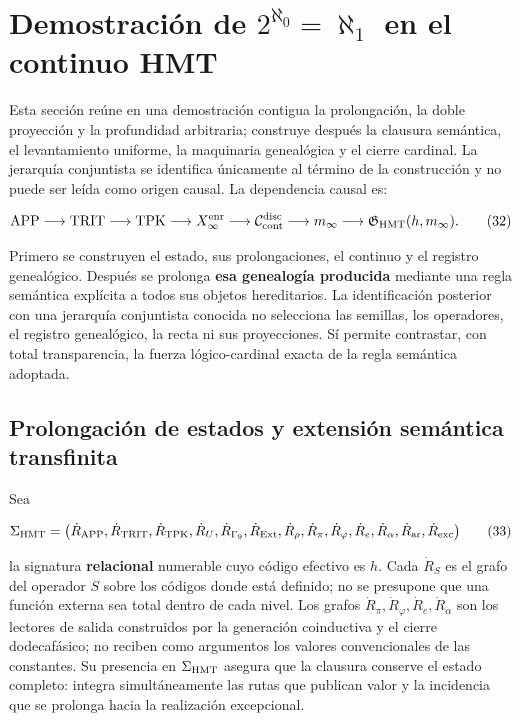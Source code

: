 \section{Demostración de \texorpdfstring{\(2^{\aleph_0}=\aleph_1\)}{2 elevado a aleph cero igual a aleph uno} en el continuo HMT}
\label{ix:sec:cierre-cardinal-nativo}

Esta sección reúne en una demostración contigua la prolongación, la doble
proyección y la profundidad arbitraria; construye después la clausura
semántica, el levantamiento uniforme, la maquinaria genealógica y el cierre
cardinal. La jerarquía conjuntista se identifica únicamente al término de la
construcción y no puede ser leída como origen causal. La dependencia causal es:

\[
 \mathrm{APP}\longrightarrow\mathrm{TRIT}\longrightarrow\mathrm{TPK}
 \longrightarrow X_\infty^{\rm enr}
 \longrightarrow\mathcal C_{\rm cont}^{\rm disc}
 \longrightarrow m_\infty
 \longrightarrow\mathfrak G_{\rm HMT}(h,m_\infty).
\tag{32}\label{ix:eq:ch-cadena-causal}
\]

Primero se construyen el estado, sus prolongaciones, el continuo y el registro genealógico.
Después se prolonga \textbf{esa genealogía producida} mediante una regla semántica
explícita a todos sus objetos hereditarios. La identificación posterior con
una jerarquía conjuntista conocida no selecciona las semillas, los operadores,
el registro genealógico, la recta ni sus proyecciones. Sí permite contrastar, con total
transparencia, la fuerza lógico-cardinal exacta de la regla semántica adoptada.

\subsection{Prolongación de estados y extensión semántica transfinita}

Sea

\[
 \Sigma_{\rm HMT}
 =\bigl(\dot R_{\rm APP},\dot R_{\rm TRIT},\dot R_{\rm TPK},
 \dot R_{U},\dot R_{\Gamma_9},\dot R_{\rm Ext},\dot R_\rho,
 \dot R_{\pi},\dot R_{\varphi},\dot R_e,\dot R_{\alpha},
 \dot R_{\rm ar},\dot R_{\rm exc}\bigr)
\tag{33}\label{ix:eq:ch-signatura}
\]

la signatura \textbf{relacional} numerable cuyo código efectivo es \(h\). Cada
\(\dot R_S\) es el grafo del operador \(S\) sobre los códigos donde está
definido; no se presupone que una función externa sea total dentro de cada
nivel. Los grafos \(\dot R_{\pi},\dot R_{\varphi},\dot R_e,\dot R_{\alpha}\)
son los lectores de salida construidos por la generación coinductiva y el
cierre dodecafásico; no reciben como argumentos los valores convencionales de
las constantes. Su presencia en \(\Sigma_{\rm HMT}\) asegura que la clausura
conserve el estado completo: integra simultáneamente las rutas que publican
valor y la incidencia que se prolonga hacia la realización excepcional.

